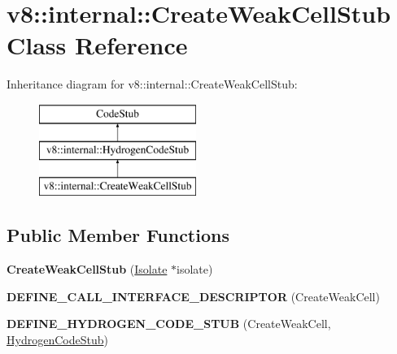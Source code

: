 \hypertarget{classv8_1_1internal_1_1_create_weak_cell_stub}{}\section{v8\+:\+:internal\+:\+:Create\+Weak\+Cell\+Stub Class Reference}
\label{classv8_1_1internal_1_1_create_weak_cell_stub}
Inheritance diagram for v8\+:\+:internal\+:\+:Create\+Weak\+Cell\+Stub\+:\begin{figure}[H]
\begin{center}
\leavevmode
\includegraphics[height=3.000000cm]{classv8_1_1internal_1_1_create_weak_cell_stub}
\end{center}
\end{figure}
\subsection*{Public Member Functions}
\begin{DoxyCompactItemize}
\item 
{\bfseries Create\+Weak\+Cell\+Stub} (\hyperlink{classv8_1_1internal_1_1_isolate}{Isolate} $\ast$isolate)\hypertarget{classv8_1_1internal_1_1_create_weak_cell_stub_a9b116d94e70491ed15618de345a1715f}{}\label{classv8_1_1internal_1_1_create_weak_cell_stub_a9b116d94e70491ed15618de345a1715f}

\item 
{\bfseries D\+E\+F\+I\+N\+E\+\_\+\+C\+A\+L\+L\+\_\+\+I\+N\+T\+E\+R\+F\+A\+C\+E\+\_\+\+D\+E\+S\+C\+R\+I\+P\+T\+OR} (Create\+Weak\+Cell)\hypertarget{classv8_1_1internal_1_1_create_weak_cell_stub_ae465fd93fbb6bd254cc08cdff7386d42}{}\label{classv8_1_1internal_1_1_create_weak_cell_stub_ae465fd93fbb6bd254cc08cdff7386d42}

\item 
{\bfseries D\+E\+F\+I\+N\+E\+\_\+\+H\+Y\+D\+R\+O\+G\+E\+N\+\_\+\+C\+O\+D\+E\+\_\+\+S\+T\+UB} (Create\+Weak\+Cell, \hyperlink{classv8_1_1internal_1_1_hydrogen_code_stub}{Hydrogen\+Code\+Stub})\hypertarget{classv8_1_1internal_1_1_create_weak_cell_stub_a436aa3c12a4db4aaa2805f21ca64ef5f}{}\label{classv8_1_1internal_1_1_create_weak_cell_stub_a436aa3c12a4db4aaa2805f21ca64ef5f}

\end{DoxyCompactItemize}
